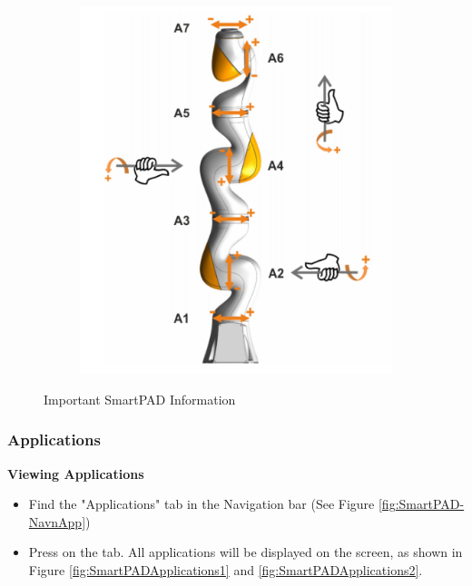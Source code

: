 \documentclass[12pt, letterpaper]{article}
\begin{document}
\begin{figure}[h!]
\begin{subfigure}[b]{0.32\textwidth}
        \includegraphics[width=\textwidth]{Images/KUKAJointAngles.png}
        \caption{}
        \label{fig:KUKAJointAngleDepiction}
    \end{subfigure}
    \caption{Important SmartPAD Information}
    \label{fig:SmartPADJoggingButtons}
\end{figure}






\subsubsection{Applications}
\textbf{Viewing Applications}
\begin{itemize}
    \item Find the "Applications" tab in the Navigation bar (See Figure \ref{fig:SmartPAD-NavnApp})
    \item Press on the tab. All applications will be displayed on the screen, as shown in Figure \ref{fig:SmartPADApplications1} and \ref{fig:SmartPADApplications2}.
\end{itemize}
\end{document}
